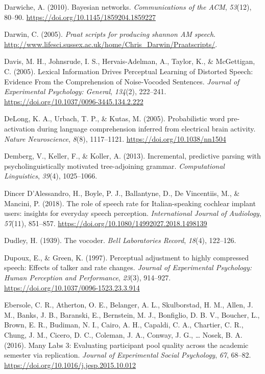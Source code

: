 \documentclass[a4paper, nobind]{templates/ociamthesis}
\newlength{\cslhangindent}
\newenvironment{CSLReferences}[2] %
 {%
  \setlength{\parindent}{0pt}
  \ifodd #1
  \let\oldpar\par
  \def\par{\hangindent=\cslhangindent\oldpar}
  \fi
  \setlength{\parskip}{1mm}
  \setlength{\baselineskip}{6mm}
 }%
 {}
\begin{document}
\begin{CSLReferences}{1}{0}
\leavevmode{}%
Darwiche, A. (2010). Bayesian networks. \emph{Communications of the ACM}, \emph{53}(12), 80--90. \url{https://doi.org/10.1145/1859204.1859227}

\leavevmode{}%
Darwin, C. (2005). \emph{Praat scripts for producing shannon AM speech}. \url{http://www.lifesci.sussex.ac.uk/home/Chris_Darwin/Praatscripts/}.

\leavevmode{}%
Davis, M. H., Johnsrude, I. S., Hervais-Adelman, A., Taylor, K., \& McGettigan, C. (2005). Lexical Information Drives Perceptual Learning of Distorted Speech: Evidence From the Comprehension of Noise-Vocoded Sentences. \emph{Journal of Experimental Psychology: General}, \emph{134}(2), 222--241. \url{https://doi.org/10.1037/0096-3445.134.2.222}

\leavevmode{}%
DeLong, K. A., Urbach, T. P., \& Kutas, M. (2005). Probabilistic word pre-activation during language comprehension inferred from electrical brain activity. \emph{Nature Neuroscience}, \emph{8}(8), 1117--1121. \url{https://doi.org/10.1038/nn1504}

\leavevmode{}%
Demberg, V., Keller, F., \& Koller, A. (2013). Incremental, predictive parsing with psycholinguistically motivated tree-adjoining grammar. \emph{Computational Linguistics}, \emph{39}(4), 1025--1066.

\leavevmode{}%
Dincer D'Alessandro, H., Boyle, P. J., Ballantyne, D., De Vincentiis, M., \& Mancini, P. (2018). {The role of speech rate for Italian-speaking cochlear implant users: insights for everyday speech perception}. \emph{International Journal of Audiology}, \emph{57}(11), 851--857. \url{https://doi.org/10.1080/14992027.2018.1498139}

\leavevmode{}%
Dudley, H. (1939). {The vocoder}. \emph{Bell Laboratories Record}, \emph{18}(4), 122--126.

\leavevmode{}%
Dupoux, E., \& Green, K. (1997). Perceptual adjustment to highly compressed speech: Effects of talker and rate changes. \emph{Journal of Experimental Psychology: Human Perception and Performance}, \emph{23}(3), 914--927. \url{https://doi.org/10.1037/0096-1523.23.3.914}

\leavevmode{}%
Ebersole, C. R., Atherton, O. E., Belanger, A. L., Skulborstad, H. M., Allen, J. M., Banks, J. B., Baranski, E., Bernstein, M. J., Bonfiglio, D. B. V., Boucher, L., Brown, E. R., Budiman, N. I., Cairo, A. H., Capaldi, C. A., Chartier, C. R., Chung, J. M., Cicero, D. C., Coleman, J. A., Conway, J. G., \ldots{} Nosek, B. A. (2016). {Many Labs 3: Evaluating participant pool quality across the academic semester via replication}. \emph{Journal of Experimental Social Psychology}, \emph{67}, 68--82. \url{https://doi.org/10.1016/j.jesp.2015.10.012}


\end{CSLReferences}
\end{document}
